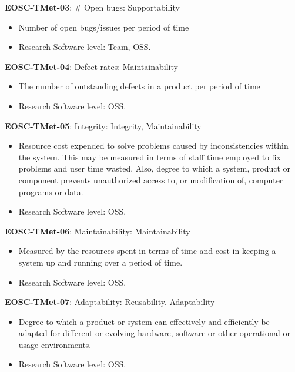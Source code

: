 \textbf{EOSC-TMet-03}: \# Open bugs: Supportability

\begin{itemize}
    \item Number of open bugs/issues per period of time \cite{montagud_systematic_2012}
    \item Research Software level: Team, OSS.
\end{itemize}

\textbf{EOSC-TMet-04}: Defect rates: Maintainability

\begin{itemize}
    \item The number of outstanding defects in a product per period of time \cite{crispin_driving_2006}
    \item Research Software level: OSS.
\end{itemize}

\textbf{EOSC-TMet-05}: Integrity: Integrity, Maintainability

\begin{itemize}
    \item Resource cost expended to solve problems caused by inconsistencies within the system. This may be measured in terms of staff time employed to fix problems and user time wasted. Also, degree to which a system, product or component prevents unauthorized access to, or modification of,
computer programs or data. \cite{iso_25010_2011_2017,gillies_modelling_1992}
    \item Research Software level: OSS.
\end{itemize}

\textbf{EOSC-TMet-06}: Maintainability: Maintainability

\begin{itemize}
    \item Measured by the resources spent in terms of time and cost in keeping a system up and running over a period of time. \cite{gillies_modelling_1992,boehm_quantitative_1976}
    \item Research Software level: OSS.
\end{itemize}

\textbf{EOSC-TMet-07}: Adaptability: Reusability. Adaptability

\begin{itemize}
    \item Degree to which a product or system can effectively and efficiently be adapted for different or evolving hardware, software or other operational or usage environments. \cite{iso_25010_2011_2017,gillies_modelling_1992,boehm_quantitative_1976}
    \item Research Software level: OSS.
\end{itemize}

